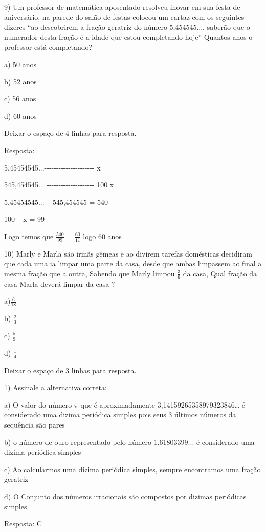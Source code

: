 {9) Um professor de matemática aposentado resolveu inovar em sua festa de
aniversário, na parede do salão de festas colocou um cartaz com os
seguintes dizeres ``ao descobrirem a fração geratriz do número
5,454545..., saberão que o numerador desta fração é a idade que estou
completando hoje'' Quantos anos o professor está completando?

a) 50 anos

b) 52 anos

c) 56 anos

d) 60 anos

Deixar o espaço de 4 linhas para resposta.

Resposta:

5,45454545...-\/-\/-\/-\/-\/-\/-\/-\/-\/-\/-\/-\/-\/-\/-\/-\/-\/-\/-\/-\/-
x

545,454545... -\/-\/-\/-\/-\/-\/-\/-\/-\/-\/-\/-\/-\/-\/-\/-\/-\/-\/-\/-
100 x

5,45454545... -- 545,454545 = 540

100 -- x = 99

Logo temos que \(\frac{540}{99}\) = \(\frac{60}{11}\) logo 60 anos

10) Marly e Marla são irmãs gêmeas e ao divirem tarefas domésticas
decidiram que cada uma ia limpar uma parte da casa, desde que ambas
limpassem ao final a mesma fração que a outra, Sabendo que Marly limpou
\(\frac{3}{9}\) da casa, Qual fração da casa Marla deverá limpar da casa
?

a)\(\frac{6}{18}\)

b) \(\frac{2}{3}\)

c) \(\frac{5}{9}\)

d) \(\frac{1}{4}\)

Deixar o espaço de 3 linhas para resposta.


1) Assinale a alternativa correta:

a) O valor do número \(\pi\) que é aproximadamente
3,14159265358979323846\ldots{} é considerado uma dizima periódica
simples pois seus 3 últimos números da sequência são pares

b) o número de ouro representado pelo número 1.61803399... é considerado
uma dizima periódica simples

c) Ao calcularmos uma dizima periódica simples, sempre encontramos uma
fração geratriz

d) O Conjunto dos números irracionais são compostos por dizimas
periódicas simples.

Resposta: C

}
